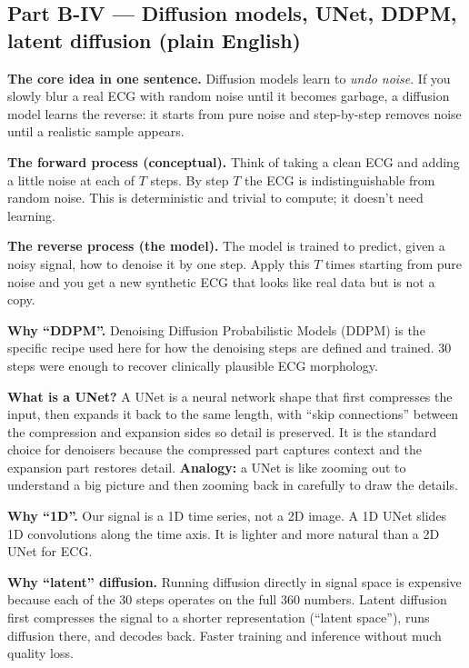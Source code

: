 \documentclass[11pt,a4paper]{article}
\begin{document}
\subsection{Part B-IV --- Diffusion models, UNet, DDPM, latent diffusion (plain English)}
\label{sec:diffusion-conceptual}

\textbf{The core idea in one sentence.}
Diffusion models learn to \emph{undo noise}. If you slowly blur a real ECG with
random noise until it becomes garbage, a diffusion model learns the reverse:
it starts from pure noise and step-by-step removes noise until a realistic
sample appears.

\textbf{The forward process (conceptual).}
Think of taking a clean ECG and adding a little noise at each of $T$ steps. By
step $T$ the ECG is indistinguishable from random noise. This is deterministic
and trivial to compute; it doesn't need learning.

\textbf{The reverse process (the model).}
The model is trained to predict, given a noisy signal, how to denoise it by
one step. Apply this $T$ times starting from pure noise and you get a new
synthetic ECG that looks like real data but is not a copy.

\textbf{Why ``DDPM''.}
Denoising Diffusion Probabilistic Models (DDPM) is the specific recipe used
here for how the denoising steps are defined and trained. 30 steps were
enough to recover clinically plausible ECG morphology.

\textbf{What is a UNet?}
A UNet is a neural network shape that first compresses the input, then
expands it back to the same length, with ``skip connections'' between the
compression and expansion sides so detail is preserved. It is the standard
choice for denoisers because the compressed part captures context and the
expansion part restores detail. \textbf{Analogy:} a UNet is like zooming
out to understand a big picture and then zooming back in carefully to draw
the details.

\textbf{Why ``1D''.}
Our signal is a 1D time series, not a 2D image. A 1D UNet slides 1D
convolutions along the time axis. It is lighter and more natural than a 2D
UNet for ECG.

\textbf{Why ``latent'' diffusion.}
Running diffusion directly in signal space is expensive because each of the 30
steps operates on the full 360 numbers. Latent diffusion first compresses the
signal to a shorter representation (``latent space''), runs diffusion there,
and decodes back. Faster training and inference without much quality loss.
\end{document}
